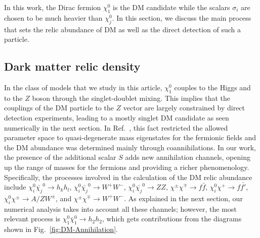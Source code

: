 \documentclass[12pt,letterpaper]{article}
\begin{document}
In this work, the Dirac fermion $\chi_1^0$ is the DM candidate while the scalars $\sigma_i$ are chosen to be much heavier than $\chi_j^0$. In this section, we discuss the main process that sets the relic abundance of DM as well as the direct detection of such a particle. 

\subsection{Dark matter relic density}
\label{sec:h2-relic-density}

In the class of models that we study in this article, $\chi_1^0$ couples to the Higgs and to the $Z$ boson through the singlet-doublet mixing. This implies that the couplings of the DM particle to the $Z$ vector are largely constrained by direct detection experiments, leading to a mostly singlet DM candidate as seen numerically in the next section. In Ref.~\cite{Yaguna:2015mva}, this fact restricted the allowed parameter space to quasi-degenerate mass eigenstates for the fermionic fields and the DM abundance was determined mainly through coannihilations. In our work, the presence of the additional scalar $S$ adds new annihilation channels, opening up the range of masses for the fermions and providing a richer phenomenology. Specifically, the processes involved in the calculation of the DM relic abundance include $\chi_i^0\bar{\chi_j}^0\to h_kh_l$,  
$\chi_i^0\bar{\chi_j}^0\to W^+W^-$,  
$\chi_i^0\bar{\chi_j}^0\to ZZ$,
$\chi^{\pm}\chi^{\mp}\to f\bar{f}$,
$\chi_i^0\chi^{+}\to f\bar{f'}$,
$\chi_i^0\chi^{\pm}\to A/Z W^{\pm}$, and
$\chi^{\pm}\chi^{\mp}\to W^+W^-$.  As explained in the next section, our numerical analysis takes into account all these channels; however, the most relevant process is $\chi_1^0\bar{\chi}_1^0\to h_2h_2$, which gets contributions from the diagrams shown in Fig.~\ref{fig:DM-Annihilation}.
\end{document}
